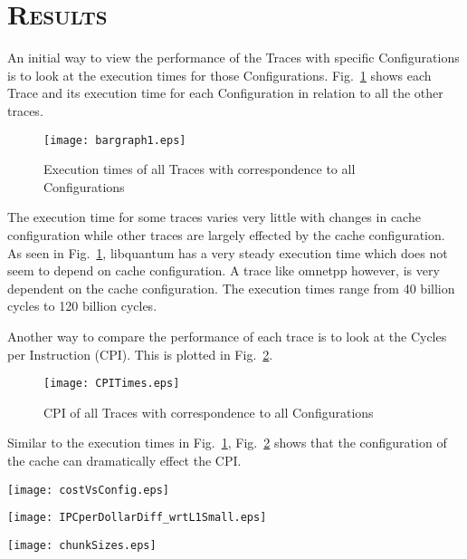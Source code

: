 \documentclass[FinalReport.tex]{subfiles}
\begin{document}
\section*{\textsc{\Large Results}}

An initial way to view the performance of the Traces with specific Configurations is to look at the execution times for those Configurations.  Fig.~\ref{fig:executiontimes} shows each Trace and its execution time for each Configuration in relation to all the other traces.
\begin{figure}[H]
\centering
\texttt{[image: bargraph1.eps]}
\caption{Execution times of all Traces with correspondence to all Configurations\label{fig:executiontimes}}
\end{figure}
The execution time for some traces varies very little with changes in cache configuration while other traces are largely effected by the cache configuration.  As seen in Fig.~\ref{fig:executiontimes}, {libquantum} has a very steady execution time which does not seem to depend on cache configuration.  A trace like {omnetpp} however, is very dependent on the cache configuration.  The execution times range from 40 billion cycles to 120 billion cycles. 

Another way to compare the performance of each trace is to look at the Cycles per Instruction (CPI).  This is plotted in Fig.~\ref{fig:CPI}.
\begin{figure}[H]
\centering
\texttt{[image: CPITimes.eps]}
\caption{CPI of all Traces with correspondence to all Configurations\label{fig:CPI}}
\end{figure}
Similar to the execution times in Fig.~\ref{fig:executiontimes}, Fig.~\ref{fig:CPI} shows that the configuration of the cache can dramatically effect the CPI. 
\begin{center}
\texttt{[image: costVsConfig.eps]}
\end{center}

\begin{center}
\texttt{[image: IPCperDollarDiff\_wrtL1Small.eps]}
\end{center}


\begin{center}
\texttt{[image: chunkSizes.eps]}
\end{center}
\end{document}
